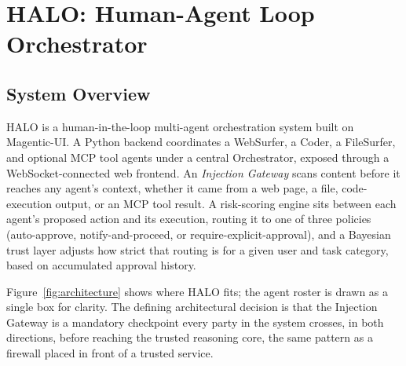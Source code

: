 \documentclass[a4paper, 11pt]{article}
\begin{document}
\section{HALO: Human-Agent Loop Orchestrator}

\subsection{System Overview}

HALO is a human-in-the-loop multi-agent orchestration system built on Magentic-UI.
A Python backend coordinates a WebSurfer, a Coder, a FileSurfer, and optional MCP
tool agents under a central Orchestrator, exposed through a WebSocket-connected
web frontend. An \textit{Injection Gateway} scans content before it reaches any
agent's context, whether it came from a web page, a file, code-execution output,
or an MCP tool result. A risk-scoring engine sits between each agent's proposed
action and its execution, routing it to one of three policies (auto-approve,
notify-and-proceed, or require-explicit-approval), and a Bayesian trust layer
adjusts how strict that routing is for a given user and task category, based on
accumulated approval history.

Figure~\ref{fig:architecture} shows where HALO fits; the agent roster is drawn as
a single box for clarity. The defining architectural decision is that the
Injection Gateway is a mandatory checkpoint every party in the system crosses, in
both directions, before reaching the trusted reasoning core, the same pattern as
a firewall placed in front of a trusted service.
\end{document}
